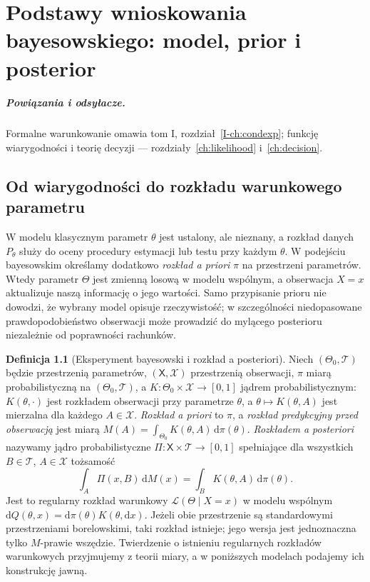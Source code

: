 \documentclass[11pt,a4paper,oneside]{report}
\numberwithin{equation}{chapter}
\theoremstyle{plain}
\theoremstyle{definition}
\newtheorem{definicja}{Definicja}[chapter]
\theoremstyle{remark}
\newcommand{\dd}{\mathrm d}
\begin{document}
\chapter{Podstawy wnioskowania bayesowskiego: model, prior i posterior}
\label{ch:bayes-foundations}
\paragraph{Powiązania i odsyłacze.} Formalne warunkowanie omawia tom I, rozdział~\ref{I-ch:condexp}; funkcję wiarygodności i teorię decyzji — rozdziały~\ref{ch:likelihood} i~\ref{ch:decision}.


\section{Od wiarygodności do rozkładu warunkowego parametru}
W modelu klasycznym parametr $\theta$ jest ustalony, ale nieznany,
a rozkład danych $P_\theta$ służy do oceny procedury estymacji lub
testu przy każdym $\theta$. W podejściu bayesowskim określamy dodatkowo
\emph{rozkład a priori} $\pi$ na przestrzeni parametrów. Wtedy parametr
$\Theta$ jest zmienną losową w modelu wspólnym, a obserwacja $X=x$
aktualizuje naszą informację o jego wartości. Samo przypisanie prioru
nie dowodzi, że wybrany model opisuje rzeczywistość; w szczególności
niedopasowane prawdopodobieństwo obserwacji może prowadzić do mylącego
posterioru niezależnie od poprawności rachunków.

\begin{definicja}[Eksperyment bayesowski i rozkład a posteriori]
\label{def:bayes-model}
Niech $(\Theta_0,\mathcal T)$ będzie przestrzenią parametrów,
$(\mathsf X,\mathcal X)$ przestrzenią obserwacji, $\pi$ miarą
probabilistyczną na $(\Theta_0,\mathcal T)$, a
$K:\Theta_0\times\mathcal X\to[0,1]$ jądrem probabilistycznym:
$K(\theta,\cdot)$ jest rozkładem obserwacji przy parametrze $\theta$,
a $\theta\mapsto K(\theta,A)$ jest mierzalna dla każdego $A\in\mathcal X$.
\emph{Rozkład a priori} to $\pi$, a \emph{rozkład predykcyjny przed
obserwacją} jest miarą $M(A)=\int_{\Theta_0}K(\theta,A)\,\dd\pi(\theta)$.
\emph{Rozkładem a posteriori} nazywamy jądro probabilistyczne
$\Pi:\mathsf X\times\mathcal T\to[0,1]$ spełniające dla wszystkich
$B\in\mathcal T$, $A\in\mathcal X$ tożsamość
\[
 \int_A\Pi(x,B)\,\dd M(x)
 =\int_B K(\theta,A)\,\dd\pi(\theta).
\]
Jest to regularny rozkład warunkowy $\mathcal L(\Theta\mid X=x)$
w modelu wspólnym $\dd Q(\theta,x)=\dd\pi(\theta)K(\theta,\dd x)$.
Jeżeli obie przestrzenie są standardowymi przestrzeniami borelowskimi,
taki rozkład istnieje; jego wersja jest jednoznaczna tylko $M$-prawie
wszędzie. Twierdzenie o istnieniu regularnych rozkładów warunkowych
przyjmujemy z teorii miary, a w poniższych modelach podajemy ich
konstrukcję jawną.
\end{definicja}
\end{document}
